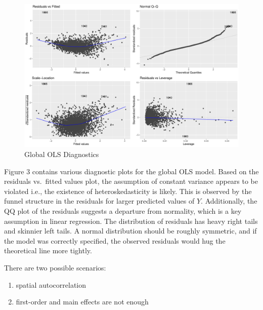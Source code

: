 \documentclass[
]{article}
\begin{document}
\begin{figure}[H]

{\centering \includegraphics{final-project-write-up-nathan-nguyen_files/figure-latex/unnamed-chunk-7-1} 

}

\caption{Global OLS Diagnostics}\label{fig:unnamed-chunk-7}
\end{figure}

Figure 3 contains various diagnostic plots for the global OLS model.
Based on the residuals vs.~fitted values plot, the assumption of
constant variance appears to be violated i.e., the existence of
heteroskedasticity is likely. This is observed by the funnel structure
in the residuals for larger predicted values of \(Y\). Additionally, the
QQ plot of the residuals suggests a departure from normality, which is a
key assumption in linear regression. The distribution of residuals has
heavy right tails and skinnier left tails. A normal distribution should
be roughly symmetric, and if the model was correctly specified, the
observed residuals would hug the theoretical line more tightly.

There are two possible scenarios:

\begin{enumerate}
\def\labelenumi{\arabic{enumi}.}
\item
  spatial autocorrelation
\item
  first-order and main effects are not enough
\end{enumerate}
\end{document}

